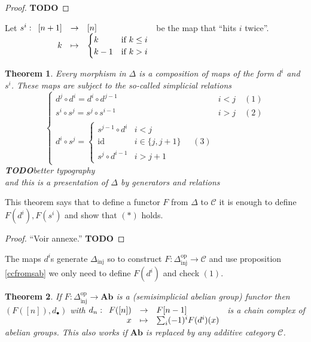 \documentclass{article}
\newcommand{\id}{\mathrm{id}}
\newcommand{\op}{\mathrm{op}}
\newcommand{\inj}{\mathrm{inj}}
\newcommand{\cat}{\mathcal{C}}
\newcommand{\Ab}{\mathbf{Ab}}
\newcommand{\todo}{\textbf{TODO}}
\newcommand{\applic}[4]{\begin{array}[t]{rcl}
#1 & \to & #2 \\
#3 & \mapsto & #4
\end{array}}
\theoremstyle{plain}
\newtheorem{theorem}{Theorem}[section]
\theoremstyle{definition}
\theoremstyle{remark}
\begin{document}
\begin{proof}
    \todo
\end{proof}

Let $s^i : \applic{[n+1]}{[n]}{k}{\begin{cases}
    k & \text{if } k \le i \\
    k-1 & \text{if } k > i
\end{cases}}$ be the map that ``hits $i$ twice''.

\begin{theorem}
    Every morphism in $\Delta$ is a composition of maps of the form $d^i$ and $s^i$. These maps are subject to the so-called \emph{simplicial} relations
    \[
    \tag{$*$}
    \begin{cases}
        d^j \circ d^i = d^i \circ d^{j-1} & i < j \quad (1) \\
        s^i \circ s^j = s^j \circ s^{i-1} & i > j \quad (2) \\
        d^i \circ s^j = \begin{cases}
            s^{j-1} \circ d^i & i < j \\
            \id & i \in \{j,j+1\} \\
            s^j \circ d^{i-1} & i > j+1
        \end{cases} \quad (3)
    \end{cases}
    \]
    \todo better typography \\
    and this is a presentation of $\Delta$ by generators and relations
\end{theorem}

This theorem says that to define a functor $F$ from $\Delta$ to $\cat$ it is enough to define $F(d^i), F(s^i)$ and show that $(*)$ holds.

\begin{proof}
    ``Voir annexe.'' \todo
\end{proof}

The maps $d^i$s generate $\Delta_\inj$ so to construct $F : \Delta_\inj^\op \to \cat$ and use proposition \ref{ccfromsab} we only need to define $F(d^i)$ and check $(1)$. 

\begin{theorem} \label{thmccfroms}
    If $F : \Delta_\inj^\op \to \Ab$ is a (semisimplicial abelian group) functor then $(F([n]),d_\bullet)$ with $d_n : \applic{F([n])}{F[n-1]}{x}{\sum_i (-1)^i F(d^i)(x)}$ is a chain complex of abelian groups. This also works if $\Ab$ is replaced by any additive category $\cat$.
\end{theorem}
\end{document}
